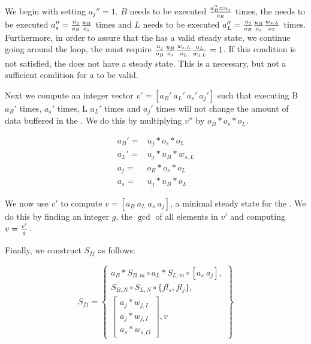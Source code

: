 We begin with setting $a_j'' = 1$. $B$ needs to be executed $a_B''
= u_j \over o_B$ times, the {\splitter} needs to be executed
$a_s'' = {u_j \over o_B}{u_B \over o_s}$ times and $L$ needs to be
executed $a_L'' = {u_j \over o_B}{u_B \over o_s}{w_{s,L} \over
o_L}$ times. Furthermore, in order to assure that the
{{\feedbackloop}} has a valid steady state, we continue going around
the loop, the {\joiner} must require ${u_j \over o_B}{u_B \over
o_s}{w_{s,L} \over o_L}{u_L \over w_{j,L}} = 1$.  If this
condition is not satisfied, the {{\feedbackloop}} does not have a
steady state. This is a necessary, but not a sufficient condition
for a {{\feedbackloop}} to be valid.

Next we compute an integer vector $v' = [a_B'\ a_L'\ a_s'\ a_j']$
such that executing B $a_B'$ times, {\splitter} $a_s'$ times, L
$a_L'$ times and {\joiner} $a_j'$ times will not change the amount
of data buffered in the {\splitjoin}. We do this by multiplying
$v''$ by $o_B * o_s * o_L$.

\begin{displaymath}
\begin{array}{rl}
a_B' = & u_j * o_s * o_L \\
a_L' = & u_j * u_B * w_{s,L} \\
a_j = & o_B * o_s * o_L \\
a_s = & u_j * u_B * o_L
\end{array}
\end{displaymath}

We now use $v'$ to compute $v = [a_B\ a_L\ a_s\ a_j]$, a minimal
steady state for the {{\feedbackloop}}.  We do this by finding an
integer $g$, the $\gcd$ of all elements in $v'$ and computing $v =
{v' \over g}$.

Finally, we construct $S_{fj}$ as follows:

\begin{displaymath}
S_{fj} = \left\{
\begin{array}{c}
a_B * S_{B,m} \circ a_L * S_{L,m} \circ [a_s \ a_j], \\
S_{B,N} \circ S_{L,N} \circ \{fl_s, fl_j\}, \\
\left[\begin{array}{c}
a_j * w_{j,I} \\
a_j * w_{j,I} \\
a_s * w_{s,O}
\end{array} \right], v
\end{array} \right\}
\end{displaymath}

